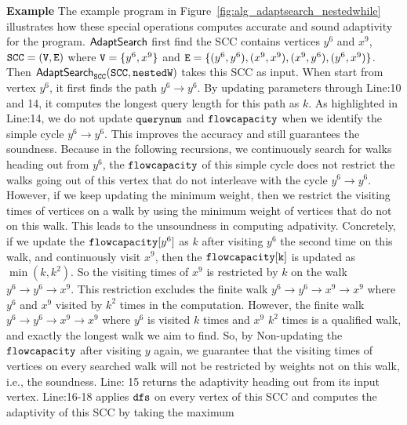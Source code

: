 \textbf{Example}
The example program in Figure~\ref{fig:alg_adaptsearch_nestedwhile} illustrates how these special
operations computes accurate and sound adaptivity for the program.
$\mathsf{AdaptSearch}$ first find the SCC contains vertices $y^6$ and $x^9$, $\mathtt{SCC} = (\mathtt{V}, \mathtt{E})$ where $\mathtt{V} = \{y^6, x^9\}$ and
$\mathtt{E} = \{(y^6, y^6), (x^9, x^9), (x^9, y^6), (y^6, x^9)\}$.
Then $\mathtt{\mathsf{AdaptSearch}_{SCC}(SCC, nestedW)}$ takes this SCC as input.
When start from vertex $y^6$, it first finds the path $y^6 \to y^6$. By updating parameters through Line:10 and 14, it computes the longest query length for this path as 
$k$.
As highlighted in Line:14, we do not update
$\mathtt{querynum}$ and $\mathtt{flowcapacity}$ when we identify the simple cycle $y^6 \to y^6$.
This improves the accuracy and still guarantees the soundness.
%
Because in the following recursions, we continuously search for walks heading out from $y^6$, 
the $\mathtt{flowcapacity}$ of this simple cycle does not restrict the walks going out of this vertex that do not interleave with the cycle $y^6 \to y^6$.
However, if we keep updating the minimum weight, then we
restrict the visiting times of vertices on a walk by
using the minimum weight of vertices that do not on this walk.
This leads to the unsoundness in computing adpativity.
Concretely, if we update the $\mathtt{flowcapacity}[y^6]$ as $k$ after visiting $y^6$ the second time 
on this walk,
and continuously visit $x^9$,
then the $\mathtt{flowcapacity[k]}$ is 
updated as $\min(k, k^2)$.
So
the visiting times of $x^9$ is restricted by $k$ on the walk $y^6 \to y^6 \to x^9$.
This restriction excludes the finite walk $y^6 \to y^6 \to x^9 \to x^9$ where $y^6$ and $x^9$ visited by $k^2$ times
in the computation. 
However, the finite walk $y^6 \to y^6 \to x^9 \to x^9$ where $y^6$ is visited $k$ times and $x^9$ $k^2$ times is 
a qualified walk, and exactly the longest walk we aim to find. So, by Non-updating the $\mathtt{flowcapacity}$ after 
visiting $y$ again, we guarantee that the visiting times of vertices on every searched walk will not be restricted by weights not on this walk,
i.e., the soundness.
Line: 15 returns the adaptivity heading out from its input vertex.
Line:16-18 applies $\mathtt{dfs}$ on every vertex of this SCC and 
computes the adaptivity of this SCC by taking the maximum 
